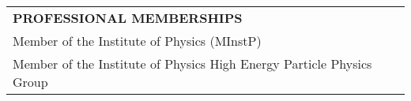 \begin{longtable}{p{}}
\textcolor{color1}{\bf PROFESSIONAL MEMBERSHIPS}\\
\arrayrulecolor{color1}
\toprule
Member of the Institute of Physics (MInstP)\\
Member of the Institute of Physics High Energy Particle Physics Group
\end{longtable}
